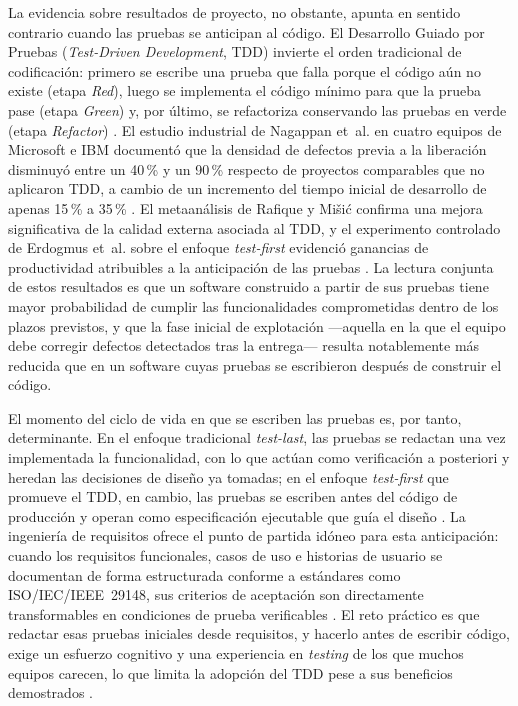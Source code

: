 \documentclass[10pt,journal,twoside,letterpaper]{IEEEtran}
\begin{document}
	La evidencia sobre resultados de proyecto, no obstante, apunta en sentido contrario cuando las pruebas se anticipan al código. El Desarrollo Guiado por Pruebas (\emph{Test-Driven Development}, TDD) invierte el orden tradicional de codificación: primero se escribe una prueba que falla porque el código aún no existe (etapa \emph{Red}), luego se implementa el código mínimo para que la prueba pase (etapa \emph{Green}) y, por último, se refactoriza conservando las pruebas en verde (etapa \emph{Refactor}) \cite{beck2003tdd}. El estudio industrial de Nagappan et~al. en cuatro equipos de Microsoft e IBM documentó que la densidad de defectos previa a la liberación disminuyó entre un 40\,\% y un 90\,\% respecto de proyectos comparables que no aplicaron TDD, a cambio de un incremento del tiempo inicial de desarrollo de apenas 15\,\% a 35\,\% \cite{nagappan2008tdd}. El metaanálisis de Rafique y Mišić confirma una mejora significativa de la calidad externa asociada al TDD, y el experimento controlado de Erdogmus et~al. sobre el enfoque \emph{test-first} evidenció ganancias de productividad atribuibles a la anticipación de las pruebas \cite{rafique2013meta,erdogmus2005testfirst}. La lectura conjunta de estos resultados es que un software construido a partir de sus pruebas tiene mayor probabilidad de cumplir las funcionalidades comprometidas dentro de los plazos previstos, y que la fase inicial de explotación ---aquella en la que el equipo debe corregir defectos detectados tras la entrega--- resulta notablemente más reducida que en un software cuyas pruebas se escribieron después de construir el código.
	
	El momento del ciclo de vida en que se escriben las pruebas es, por tanto, determinante. En el enfoque tradicional \emph{test-last}, las pruebas se redactan una vez implementada la funcionalidad, con lo que actúan como verificación a posteriori y heredan las decisiones de diseño ya tomadas; en el enfoque \emph{test-first} que promueve el TDD, en cambio, las pruebas se escriben antes del código de producción y operan como especificación ejecutable que guía el diseño \cite{beck2003tdd,erdogmus2005testfirst}. La ingeniería de requisitos ofrece el punto de partida idóneo para esta anticipación: cuando los requisitos funcionales, casos de uso e historias de usuario se documentan de forma estructurada conforme a estándares como ISO/IEC/IEEE~29148, sus criterios de aceptación son directamente transformables en condiciones de prueba verificables \cite{iso29148}. El reto práctico es que redactar esas pruebas iniciales desde requisitos, y hacerlo antes de escribir código, exige un esfuerzo cognitivo y una experiencia en \emph{testing} de los que muchos equipos carecen, lo que limita la adopción del TDD pese a sus beneficios demostrados \cite{ghafari2020inconclusive}.
	
\end{document}
